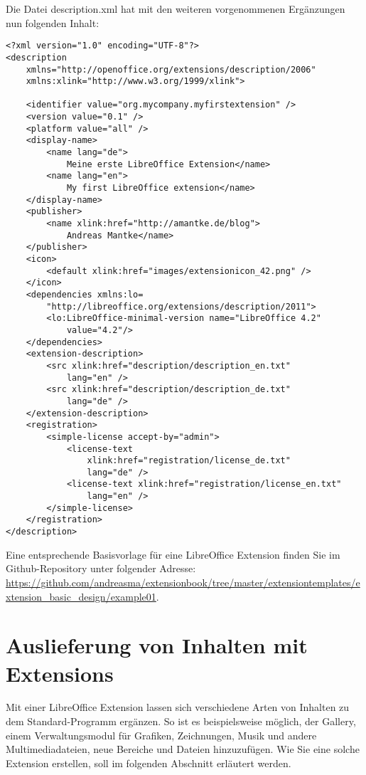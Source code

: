 \documentclass[a4paper,10pt,pagesize,titlepage]{scrbook}
\begin{document}
Die Datei description.xml hat mit den weiteren vorgenommenen Ergänzungen nun folgenden Inhalt:

\begin{lstlisting}
<?xml version="1.0" encoding="UTF-8"?>
<description
    xmlns="http://openoffice.org/extensions/description/2006"
    xmlns:xlink="http://www.w3.org/1999/xlink">

    <identifier value="org.mycompany.myfirstextension" />
    <version value="0.1" />
    <platform value="all" />
    <display-name>
        <name lang="de">
            Meine erste LibreOffice Extension</name>
        <name lang="en">
            My first LibreOffice extension</name>
    </display-name>
    <publisher>
        <name xlink:href="http://amantke.de/blog">
            Andreas Mantke</name>
    </publisher>
    <icon>
        <default xlink:href="images/extensionicon_42.png" />
    </icon>
    <dependencies xmlns:lo=
        "http://libreoffice.org/extensions/description/2011">
        <lo:LibreOffice-minimal-version name="LibreOffice 4.2" 
            value="4.2"/>
    </dependencies>
    <extension-description>
        <src xlink:href="description/description_en.txt" 
            lang="en" />
        <src xlink:href="description/description_de.txt" 
            lang="de" />
    </extension-description>
    <registration>
        <simple-license accept-by="admin">
            <license-text 
                xlink:href="registration/license_de.txt" 
                lang="de" />
            <license-text xlink:href="registration/license_en.txt" 
                lang="en" />
        </simple-license>
    </registration>
</description>

\end{lstlisting}

Eine entsprechende Basisvorlage für eine LibreOffice Extension finden Sie im Github-Repository unter folgender Adresse:
\url{https://github.com/andreasma/extensionbook/tree/master/extensiontemplates/extension_basic_design/example01}.

\chapter{Auslieferung von Inhalten mit Extensions}

Mit einer LibreOffice Extension lassen sich verschiedene Arten von Inhalten zu dem Standard-Programm ergänzen. So ist es beispielsweise möglich, der Gallery, einem Verwaltungsmodul für Grafiken, Zeichnungen, Musik und andere Multimediadateien, neue Bereiche und Dateien hinzuzufügen. Wie Sie eine solche Extension erstellen, soll im folgenden Abschnitt erläutert werden.
\end{document}
